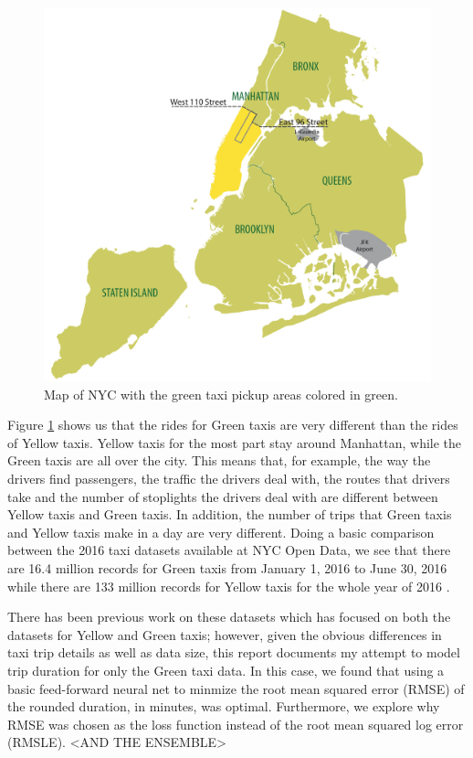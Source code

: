 \documentclass[conference]{IEEEtran}
\begin{document}
\begin{figure}
  \centering
    \includegraphics[width=\linewidth]{map_service_area.png}
      \caption{Map of NYC with the green taxi pickup areas colored in green. \cite{boroTaxi}}
      \label{greenZone}
\end{figure}

Figure \ref{greenZone} shows us that the rides for Green taxis are very different than the rides of Yellow taxis.  Yellow taxis for the most part stay around Manhattan, while the Green taxis are all over the city.  This means that, for example, the way the drivers find passengers, the traffic the drivers deal with, the routes that drivers take and the number of stoplights the drivers deal with are different between Yellow taxis and Green taxis.  In addition, the number of trips that Green taxis and Yellow taxis make in a day are very different.  Doing a basic comparison between the 2016 taxi datasets available at NYC Open Data, we see that there are 16.4 million records for Green taxis from January 1, 2016 to June 30, 2016 \cite{green2016} while there are 133 million records for Yellow taxis for the whole year of 2016 \cite{yellow2016}.  

There has been previous work on these datasets which has focused on both the datasets for Yellow and Green taxis; however, given the obvious differences in taxi trip details as well as data size, this report documents my attempt to model trip duration for only the Green taxi data.   In this case, we found that using a basic feed-forward neural net to minmize the root mean squared error (RMSE) of the rounded duration, in minutes, was optimal.  Furthermore, we explore why RMSE was chosen as the loss function instead of the root mean squared log error (RMSLE).  <AND THE ENSEMBLE>
\end{document}

